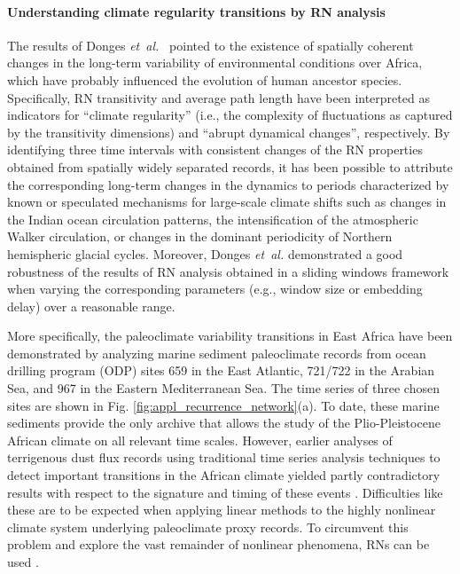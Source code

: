 		\paragraph{Understanding climate regularity transitions by RN analysis}
		The results of Donges \textit{et~al.}~\cite{Donges2011a} pointed to the existence of spatially coherent changes in the long-term variability of environmental conditions over Africa, which have probably influenced the evolution of human ancestor species. Specifically, RN transitivity and average path length have been interpreted as indicators for ``climate regularity'' (i.e., the complexity of fluctuations as captured by the transitivity dimensions) and ``abrupt dynamical changes'', respectively. By identifying three time intervals with consistent changes of the RN properties obtained from spatially widely separated records, it has been possible to attribute the corresponding long-term changes in the dynamics to periods characterized by known or speculated mechanisms for large-scale climate shifts such as changes in the Indian ocean circulation patterns, the intensification of the atmospheric Walker circulation, or changes in the dominant periodicity of Northern hemispheric glacial cycles. Moreover, Donges \textit{et~al.}\cite{Donges2011} demonstrated a good robustness of the results of RN analysis obtained in a sliding windows framework when varying the corresponding parameters (e.g., window size or embedding delay) over a reasonable range.

		More specifically, the paleoclimate variability transitions in East Africa have been demonstrated by analyzing marine sediment paleoclimate records from ocean drilling program (ODP) sites 659 in the East Atlantic, 721/722 in the Arabian Sea, and 967 in the Eastern Mediterranean Sea. The time series of three chosen sites are shown in Fig. \ref{fig:appl_recurrence_network}(a). To date, these marine sediments provide the only archive that allows the study of the Plio-Pleistocene African climate on all relevant time scales. However, earlier analyses of terrigenous dust flux records using traditional time series analysis techniques to detect important transitions in the African climate yielded partly contradictory results with respect to the signature and timing of these events \cite{deMenocal2004,Trauth2009}. Difficulties like these are to be expected when applying linear methods to the highly nonlinear climate system underlying paleoclimate proxy records. To circumvent this problem and explore the vast remainder of nonlinear phenomena, RNs can be used \cite{Donges2011a}.

